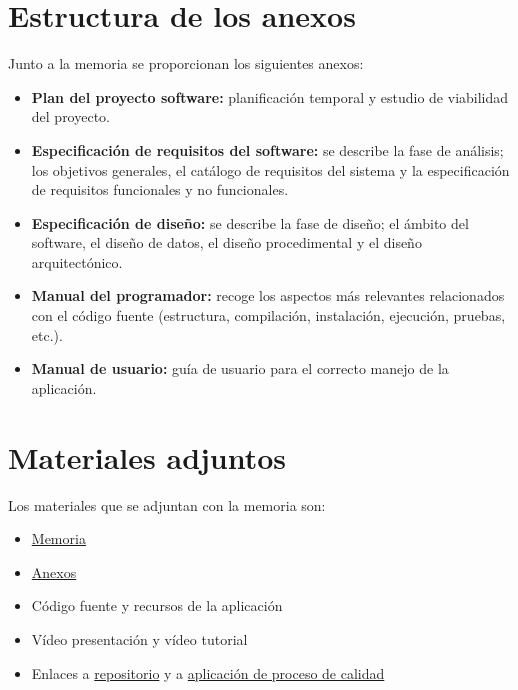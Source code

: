 \section{Estructura de los anexos}
Junto a la memoria se proporcionan los siguientes anexos:
\begin{itemize}
    \item \textbf{Plan del proyecto software: }planificación temporal y estudio de viabilidad del proyecto.
    \item \textbf{Especificación de requisitos del software: }se describe la fase de análisis; los objetivos generales, el catálogo de requisitos del sistema y la especificación de requisitos funcionales y no funcionales.
    \item \textbf{Especificación de diseño: }se describe la fase de diseño; el ámbito del software, el diseño de datos, el diseño procedimental y el diseño arquitectónico.
    \item \textbf{Manual del programador: }recoge los aspectos más relevantes relacionados con el código fuente (estructura, compilación, instalación, ejecución, pruebas, etc.).
    \item \textbf{Manual de usuario: }guía de usuario para el correcto manejo de la aplicación.
\end{itemize}

\section{Materiales adjuntos}

Los materiales que se adjuntan con la memoria son:

\begin{itemize}
    \item \href{https://github.com/jrp1004/CrowsFoot_JuanRomera_TFG/doc/memoria.pdf}{Memoria}
    \item \href{https://github.com/jrp1004/CrowsFoot_JuanRomera_TFG/doc/anexos.pdf}{Anexos}
    \item Código fuente y recursos de la aplicación
    \item Vídeo presentación y vídeo tutorial
    \item Enlaces a \href{https://github.com/jrp1004/CrowsFoot_JuanRomera_TFG}{repositorio} y a \href{https://sonarcloud.io/project/overview?id=jrp1004_CrowsFoot_JuanRomera_TFG}{aplicación de proceso de calidad}
\end{itemize}